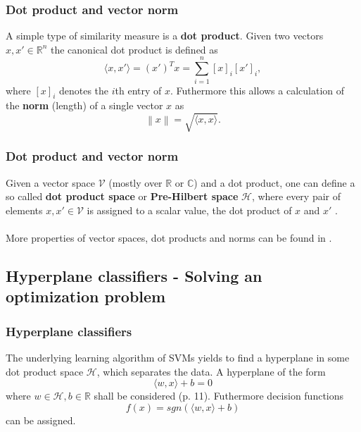 \documentclass{beamer}
\begin{document}
\begin{frame}{}
    \frametitle{Dot product and vector norm}
    A simple type of similarity measure is a \textbf{dot product}. Given two vectors $x, x' \in \mathbb{R}^n$ the canonical dot product is defined as
    \begin{equation}
        \langle x,x' \rangle = (x')^T x = \sum_{i = 1}^{n} [x]_i [x']_i,
    \end{equation}
    where $\left[x\right]_i$ denotes the $i$th entry of $x$. Futhermore this allows a calculation of the \textbf{norm} (length) of a single vector $x$ as 
    \begin{equation}
        \left\lVert x \right\rVert = \sqrt{\langle x,x \rangle}.
    \end{equation}
\end{frame}


\begin{frame}{}
    \frametitle{Dot product and vector norm}
    Given a vector space $\mathcal{V}$ (mostly over $\mathbb{R}$ or $\mathbb{C}$) and a dot product, one can define a so called \textbf{dot product space} or \textbf{Pre-Hilbert space} $\mathcal{H}$, where every pair of elements $x, x' \in \mathcal{V}$ is assigned to a scalar value, the dot product of $x$ and $x'$ \cite{Bronstein}. \\~\\

    More properties of vector spaces, dot products and norms can be found in \cite{Liesen}.
\end{frame}


\subsection{Hyperplane classifiers - Solving an optimization problem}

\begin{frame}{}
    \frametitle{Hyperplane classifiers}
    The underlying learning algorithm of SVMs yields to find a hyperplane in some dot product space $\mathcal{H}$, which separates the data. A hyperplane of the form
    \begin{equation}
        \langle w,x \rangle + b = 0
    \end{equation}
    where $w \in \mathcal{H}, b \in \mathbb{R}$ shall be considered \cite{Schoelkopf}(p. 11). Futhermore decision functions 
    \begin{equation}
        f(x) = sgn \left( \langle w,x \rangle + b \right)
    \end{equation}
    can be assigned.
\end{frame}
\end{document}
